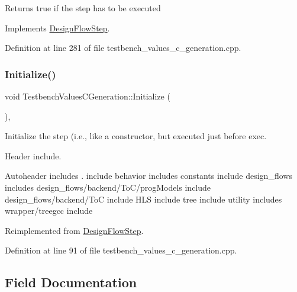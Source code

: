 \begin{DoxyReturn}{Returns}
true if the step has to be executed 
\end{DoxyReturn}


Implements \hyperlink{classDesignFlowStep_a1783abe0c1d162a52da1e413d5d1ef05}{Design\+Flow\+Step}.



Definition at line 281 of file testbench\+\_\+values\+\_\+c\+\_\+generation.\+cpp.

\mbox{\label{classTestbenchValuesCGeneration_a9cd290bc7ce4f2ada56343231d3341e2}} 
\subsubsection{\texorpdfstring{Initialize()}{Initialize()}}
{\footnotesize\ttfamily void Testbench\+Values\+C\+Generation\+::\+Initialize (\begin{DoxyParamCaption}{ }\end{DoxyParamCaption})\hspace{0.3cm}{\ttfamily [protected]}, {\ttfamily [virtual]}}



Initialize the step (i.\+e., like a constructor, but executed just before exec. 

Header include.

Autoheader includes . include behavior includes constants include design\+\_\+flows includes design\+\_\+flows/backend/\+To\+C/prog\+Models include design\+\_\+flows/backend/\+ToC include H\+LS include tree include utility includes wrapper/treegcc include 

Reimplemented from \hyperlink{classDesignFlowStep_a44b50683382a094976e1d432a7784799}{Design\+Flow\+Step}.



Definition at line 91 of file testbench\+\_\+values\+\_\+c\+\_\+generation.\+cpp.



\subsection{Field Documentation}
\mbox{\label{classTestbenchValuesCGeneration_a3777686786b90a1ccf6553e7da012427}} 
